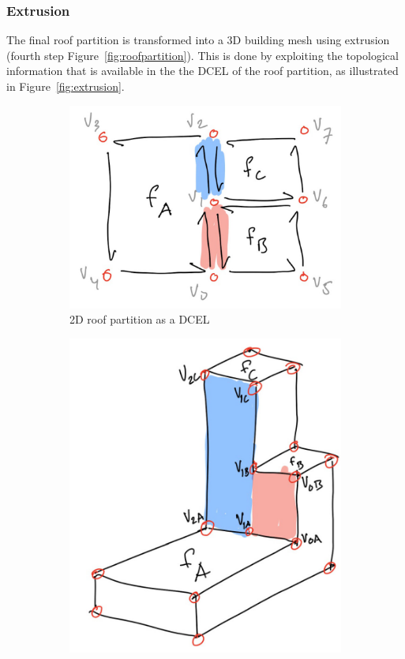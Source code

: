 \subsubsection{Extrusion}
\label{sec:extrusion}
The final roof partition is transformed into a 3D building mesh using extrusion (fourth step Figure~\ref{fig:roofpartition}).
This is done by exploiting the topological information that is available in the the DCEL of the roof partition, as illustrated in Figure~\ref{fig:extrusion}.
\begin{figure}
	\centering
	\begin{subfigure}[b]{0.4\linewidth}
		\includegraphics[width=\linewidth]{figs/2DDCEL.pdf}
		\caption{2D roof partition as a DCEL}%
		\label{subfig:2ddcel}
	\end{subfigure}
	\quad
	\begin{subfigure}[b]{0.3\linewidth}
		\includegraphics[width=\linewidth]{figs/3DDCEL.pdf}

\end{subfigure}
\end{figure}
